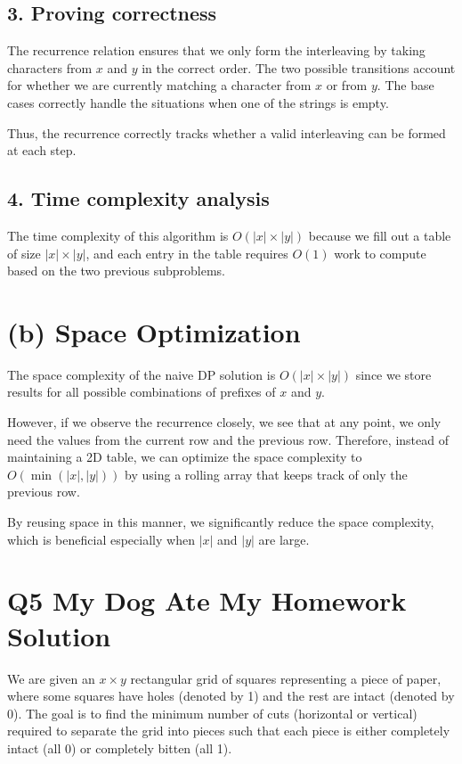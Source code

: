 \documentclass[11pt]{article}
\begin{document}
\subsection*{3. Proving correctness}
The recurrence relation ensures that we only form the interleaving by taking characters from \( x \) and \( y \) in the correct order. The two possible transitions account for whether we are currently matching a character from \( x \) or from \( y \). The base cases correctly handle the situations when one of the strings is empty.

Thus, the recurrence correctly tracks whether a valid interleaving can be formed at each step.

\subsection*{4. Time complexity analysis}
The time complexity of this algorithm is \( O(|x| \times |y|) \) because we fill out a table of size \( |x| \times |y| \), and each entry in the table requires \( O(1) \) work to compute based on the two previous subproblems.

\section*{(b) Space Optimization}
The space complexity of the naive DP solution is \( O(|x| \times |y|) \) since we store results for all possible combinations of prefixes of \( x \) and \( y \). 

However, if we observe the recurrence closely, we see that at any point, we only need the values from the current row and the previous row. Therefore, instead of maintaining a 2D table, we can optimize the space complexity to \( O(\min(|x|, |y|)) \) by using a rolling array that keeps track of only the previous row.

By reusing space in this manner, we significantly reduce the space complexity, which is beneficial especially when \( |x| \) and \( |y| \) are large.



\newpage


\section*{Q5 My Dog Ate My Homework Solution}

We are given an \( x \times y \) rectangular grid of squares representing a piece of paper, where some squares have holes (denoted by 1) and the rest are intact (denoted by 0). The goal is to find the minimum number of cuts (horizontal or vertical) required to separate the grid into pieces such that each piece is either completely intact (all 0) or completely bitten (all 1).
\end{document}
